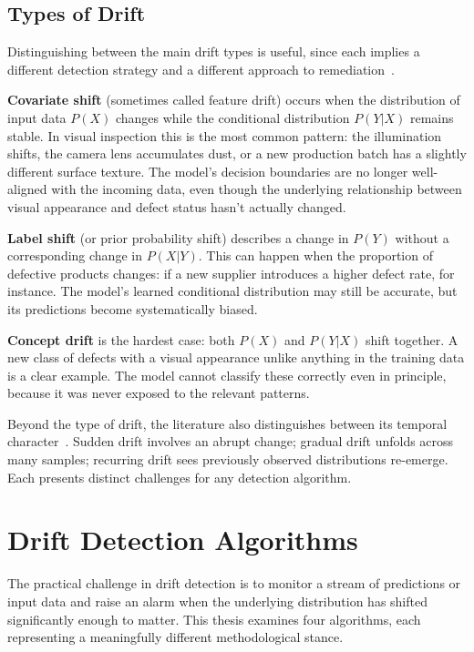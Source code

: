 \subsection{Types of Drift}

Distinguishing between the main drift types is useful, since each implies a different detection strategy and a different approach to remediation~\autocite{Bayram2022}.

\textbf{Covariate shift} (sometimes called feature drift) occurs when the distribution of input data $P(X)$ changes while the conditional distribution $P(Y|X)$ remains stable. In visual inspection this is the most common pattern: the illumination shifts, the camera lens accumulates dust, or a new production batch has a slightly different surface texture. The model's decision boundaries are no longer well-aligned with the incoming data, even though the underlying relationship between visual appearance and defect status hasn't actually changed.

\textbf{Label shift} (or prior probability shift) describes a change in $P(Y)$ without a corresponding change in $P(X|Y)$. This can happen when the proportion of defective products changes: if a new supplier introduces a higher defect rate, for instance. The model's learned conditional distribution may still be accurate, but its predictions become systematically biased.

\textbf{Concept drift} is the hardest case: both $P(X)$ and $P(Y|X)$ shift together. A new class of defects with a visual appearance unlike anything in the training data is a clear example. The model cannot classify these correctly even in principle, because it was never exposed to the relevant patterns.

Beyond the type of drift, the literature also distinguishes between its temporal character~\autocite{Gama2014}. Sudden drift involves an abrupt change; gradual drift unfolds across many samples; recurring drift sees previously observed distributions re-emerge. Each presents distinct challenges for any detection algorithm.

\section{Drift Detection Algorithms}
\label{sec:driftdetection}

The practical challenge in drift detection is to monitor a stream of predictions or input data and raise an alarm when the underlying distribution has shifted significantly enough to matter. This thesis examines four algorithms, each representing a meaningfully different methodological stance.


